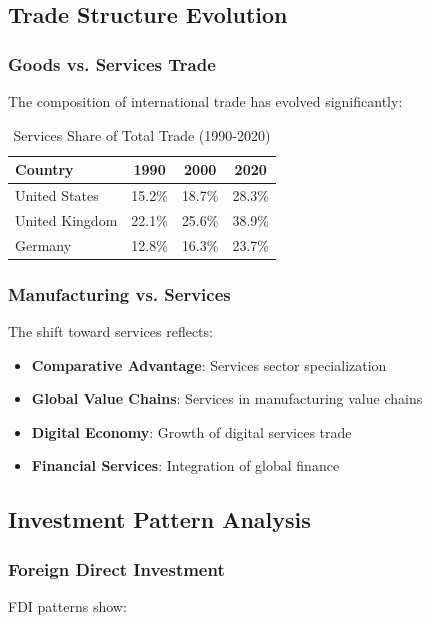 \documentclass[11pt,a4paper]{article}
\begin{document}
\subsection{Trade Structure Evolution}

\subsubsection{Goods vs. Services Trade}
The composition of international trade has evolved significantly:

\begin{table}[h]
\centering
\caption{Services Share of Total Trade (1990-2020)}
\begin{tabular}{lccc}
\toprule
\textbf{Country} & \textbf{1990} & \textbf{2000} & \textbf{2020} \\
\midrule
United States & 15.2\% & 18.7\% & 28.3\% \\
United Kingdom & 22.1\% & 25.6\% & 38.9\% \\
Germany & 12.8\% & 16.3\% & 23.7\% \\
\bottomrule
\end{tabular}
\end{table}

\subsubsection{Manufacturing vs. Services}
The shift toward services reflects:

\begin{itemize}
    \item \textbf{Comparative Advantage}: Services sector specialization
    \item \textbf{Global Value Chains}: Services in manufacturing value chains
    \item \textbf{Digital Economy}: Growth of digital services trade
    \item \textbf{Financial Services}: Integration of global finance
\end{itemize}

\subsection{Investment Pattern Analysis}

\subsubsection{Foreign Direct Investment}
FDI patterns show:
\end{document}
